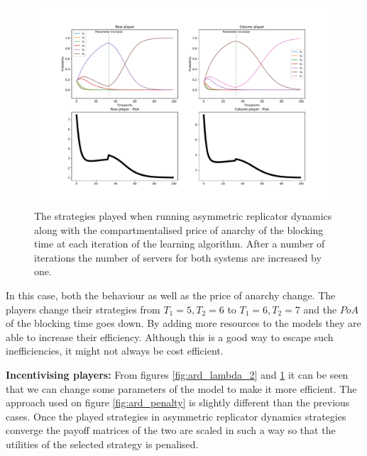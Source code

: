 \begin{figure}[H]
    \includegraphics[width=\textwidth]{imgs/asymmetric_rd_and_PoA/asymmetric_increase_C.pdf}
    \caption{
        The strategies played when running asymmetric replicator dynamics
        along with the compartmentalised price of anarchy of the blocking time 
        at each iteration of the learning algorithm. After a number of 
        iterations the number of servers for both systems are increased by one.
    }
    \label{fig:ard_num_of_servers}
\end{figure}

In this case, both the behaviour as well as the price of anarchy change.
The players change their strategies from \(T_1 = 5, T_2 = 6\) to 
\(T_1 = 6, T_2 = 7\) and the \(PoA\) of the blocking time goes down.
By adding more resources to the models they are able to increase their 
efficiency.
Although this is a good way to escape such inefficiencies, it might not always
be cost efficient.

\textbf{Incentivising players:}
From figures \ref{fig:ard_lambda_2} and \ref{fig:ard_num_of_servers} it can be
seen that we can change some parameters of the model to make it more efficient.
The approach used on figure \ref{fig:ard_penalty} is slightly different than 
the previous cases.
Once the played strategies in asymmetric replicator dynamics strategies 
converge the payoff matrices of the two are scaled in such a way so that the 
utilities of the selected strategy is penalised.

